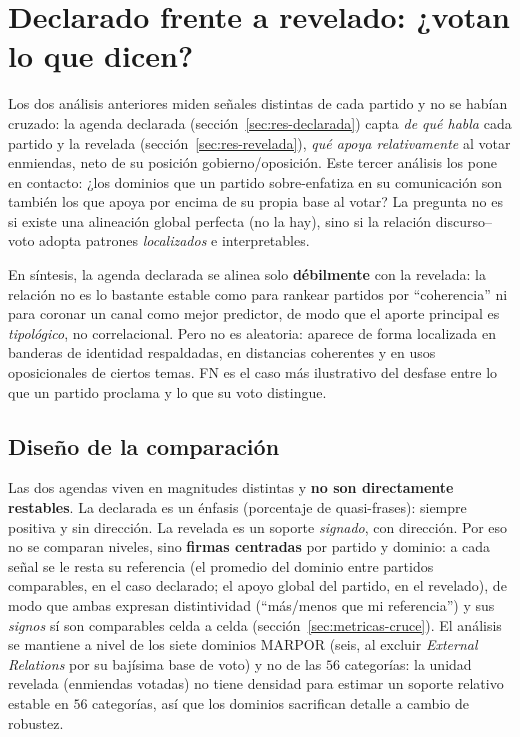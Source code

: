\section{Declarado frente a revelado: ¿votan lo que dicen?}
\label{sec:res-declarado-revelado}

Los dos análisis anteriores miden señales distintas de cada partido y no se
habían cruzado: la agenda declarada (sección~\ref{sec:res-declarada}) capta
\emph{de qué habla} cada partido y la revelada
(sección~\ref{sec:res-revelada}), \emph{qué apoya relativamente} al votar
enmiendas, neto de su posición gobierno/oposición. Este tercer análisis los pone
en contacto: ¿los dominios que un partido sobre-enfatiza en su comunicación son
también los que apoya por encima de su propia base al votar? La pregunta no es si
existe una alineación global perfecta (no la hay), sino si la relación
discurso--voto adopta patrones \emph{localizados} e interpretables.

En síntesis, la agenda declarada se alinea solo \textbf{débilmente} con la
revelada: la relación no es lo bastante estable como para rankear partidos por
``coherencia'' ni para coronar un canal como mejor predictor, de modo que el
aporte principal es \emph{tipológico}, no correlacional. Pero no es aleatoria:
aparece de forma localizada en banderas de identidad respaldadas, en distancias
coherentes y en usos oposicionales de ciertos temas. FN es el caso más
ilustrativo del desfase entre lo que un partido proclama y lo que su voto
distingue.

\subsection{Diseño de la comparación}
\label{sec:res-cruce-diseno}

Las dos agendas viven en magnitudes distintas y \textbf{no son directamente
restables}. La declarada es un énfasis (porcentaje de quasi-frases): siempre
positiva y sin dirección. La revelada es un soporte \emph{signado}, con
dirección. Por eso no
se comparan niveles, sino \textbf{firmas centradas} por partido y dominio: a cada
señal se le resta su referencia (el promedio del dominio entre partidos
comparables, en el caso declarado; el apoyo global del partido, en el revelado),
de modo que ambas expresan distintividad (``más/menos que mi referencia'') y
sus \emph{signos} sí son comparables celda a celda
(sección~\ref{sec:metricas-cruce}). El análisis se mantiene a nivel de los siete
dominios MARPOR (seis, al excluir \emph{External Relations} por su bajísima base
de voto) y no de las $56$ categorías: la unidad revelada (enmiendas votadas)
no tiene densidad para estimar un soporte relativo estable en $56$ categorías, así
que los dominios sacrifican detalle a cambio de robustez.

